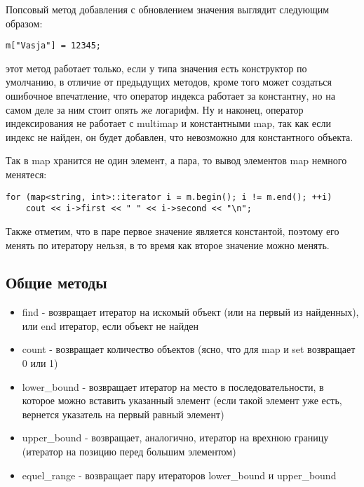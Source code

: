 \begin{itemize}
Попсовый метод добавления с обновлением значения выглядит следующим образом:
\begin{lstlisting}
m["Vasja"] = 12345;
\end{lstlisting}
этот метод работает только, если у типа значения есть конструктор по умолчанию, в отличие от предыдущих методов, кроме того может создаться ошибочное впечатление,
что оператор индекса работает за константну, но на самом деле за ним стоит опять же логарифм. Ну и наконец, оператор индексирования не работает с multimap и
константными map, так как если индекс не найден, он будет добавлен, что невозможно для константного объекта.

Так в map хранится не один элемент, а пара, то вывод элементов map немного менятеся:
\begin{lstlisting}
for (map<string, int>::iterator i = m.begin(); i != m.end(); ++i)
	cout << i->first << " " << i->second << "\n";
\end{lstlisting}

Также отметим, что в паре первое значение является константой, поэтому его менять по итератору нельзя, в то время как второе значение можно менять.
\end{itemize}

\subsection{Общие методы}

\begin{itemize}
\item find - возвращает итератор на искомый объект (или на первый из найденных), или end итератор, если объект не найден

\item count - возвращает количество объектов (ясно, что для map и set возвращает 0 или 1)

\item lower\_bound - возвращает итератор на место в последовательности, в которое можно вставить указанный элемент (если такой элемент уже есть,
вернется указатель на первый равный элемент)

\item upper\_bound - возвращает, аналогично, итератор на врехнюю границу (итератор на позицию перед большим элементом)

\item equel\_range - возвращает пару итераторов lower\_bound и upper\_bound
\end{itemize}

